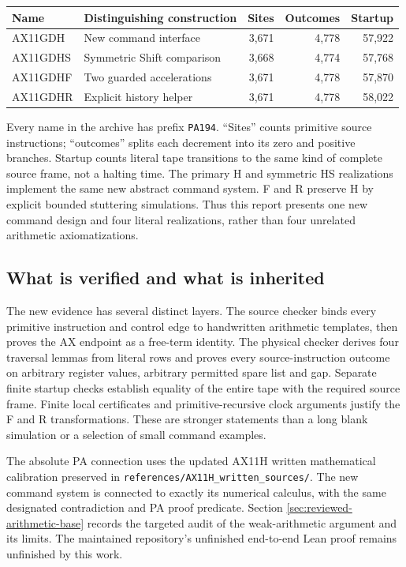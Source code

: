 \documentclass[11pt,a4paper]{article}
\begin{document}
\begin{center}
\begin{tabular}{@{}llrrr@{}}
\toprule
Name & Distinguishing construction & Sites & Outcomes & Startup\\
\midrule
AX11GDH & New command interface & 3,671 & 4,778 & 57,922\\
AX11GDHS & Symmetric Shift comparison & 3,668 & 4,774 & 57,768\\
AX11GDHF & Two guarded accelerations & 3,671 & 4,778 & 57,870\\
AX11GDHR & Explicit history helper & 3,671 & 4,778 & 58,022\\
\bottomrule
\end{tabular}
\end{center}
Every name in the archive has prefix \texttt{PA194}. ``Sites'' counts
primitive source instructions; ``outcomes'' splits each decrement into
its zero and positive branches. Startup counts literal tape transitions
to the same kind of complete source frame, not a halting time.
The primary H and symmetric HS realizations implement the same new
abstract command system. F and R preserve H by explicit bounded
stuttering simulations. Thus this report presents one new command design
and four literal realizations, rather than four unrelated arithmetic
axiomatizations.



\subsection{What is verified and what is inherited}

The new evidence has several distinct layers. The source checker binds
every primitive instruction and control edge to handwritten arithmetic
templates, then proves the AX endpoint as a free-term identity. The
physical checker derives four traversal lemmas from literal rows and
proves every source-instruction outcome on arbitrary register values,
arbitrary permitted spare list and gap. Separate finite startup checks
establish equality of the entire tape with the required source frame.
Finite local certificates and primitive-recursive clock arguments justify
the F and R transformations. These are stronger statements than a long
blank simulation or a selection of small command examples.

The absolute PA connection uses the updated AX11H written mathematical
calibration preserved in \texttt{references/AX11H\_written\_sources/}.
The new command system is connected to exactly its numerical calculus,
with the same designated contradiction and PA proof predicate. Section
\ref{sec:reviewed-arithmetic-base} records the targeted audit of the
weak-arithmetic argument and its limits. The maintained repository's
unfinished end-to-end Lean proof remains unfinished by this work.
\end{document}
